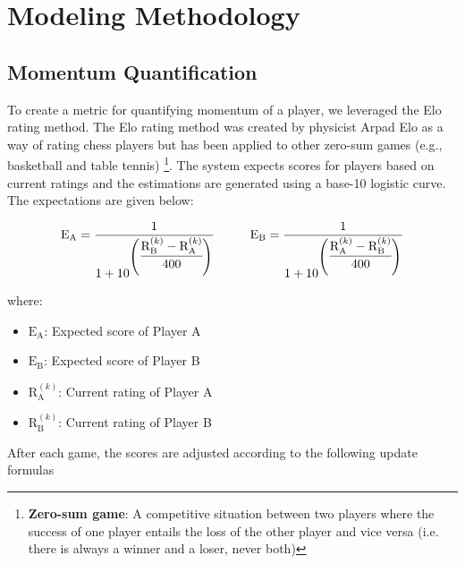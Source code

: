 \documentclass[letterpaper, 12pt]{article}
\begin{document}
    \section{Modeling Methodology}

        \subsection{Momentum Quantification}
    
            To create a metric for quantifying momentum of a player, we leveraged the Elo rating method. The Elo rating method was created by physicist Arpad Elo as a way of rating chess players but has been applied to other zero-sum games (e.g., basketball and table tennis) \footnote{\textbf{Zero-sum game}: A competitive situation between two players where the success of one player entails the loss of the other player and vice versa (i.e. there is always a winner and a loser, never both)}. The system expects scores for players based on current ratings and the estimations are generated using a base-10 logistic curve. The expectations are given below:

            \begin{align}
                \text{E}_{\text{A}} = \frac{1}{1 + 10^{\left( \cfrac{\text{R}^{(k)}_{\text{B}} - \text{R}^{(k)}_{\text{A}}}{400}\right)}} \hspace{1cm} \text{E}_{\text{B}} = \frac{1}{1 + 10^{\left( \cfrac{\text{R}^{(k)}_{\text{A}} - \text{R}^{(k)}_{\text{B}}}{400}\right)}} \label{eq:Elo_Expected_Scores}
            \end{align}

            \noindent
            where:
            \begin{itemize}[itemsep=0.1em, label=]
                \item $\text{E}_{\text{A}}$: Expected score of Player A
                \item $\text{E}_{\text{B}}$: Expected score of Player B
                \item $\text{R}^{(k)}_{\text{A}}$: Current rating of Player A
                \item $\text{R}^{(k)}_{\text{B}}$: Current rating of Player B
            \end{itemize}
            
            \noindent
            After each game, the scores are adjusted according to the following update formulas
\end{document}
